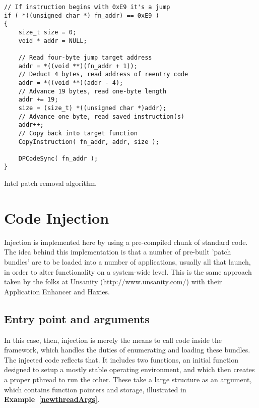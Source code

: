\documentclass[english]{article}
\begin{document}
\begin{sourcecode}
\begin{verbatim}
// If instruction begins with 0xE9 it's a jump
if ( *((unsigned char *) fn_addr) == 0xE9 )
{
    size_t size = 0;
    void * addr = NULL;

    // Read four-byte jump target address
    addr = *((void **)(fn_addr + 1));
    // Deduct 4 bytes, read address of reentry code
    addr = *((void **)(addr - 4);
    // Advance 19 bytes, read one-byte length
    addr += 19;
    size = (size_t) *((unsigned char *)addr);
    // Advance one byte, read saved instruction(s)
    addr++;
    // Copy back into target function
    CopyInstruction( fn_addr, addr, size );

    DPCodeSync( fn_addr );
}
\end{verbatim}
\caption{Intel patch removal algorithm}
\label{intelRemPatch}
\end{sourcecode}

\section{Code Injection}

Injection is implemented here by using a pre-compiled chunk of standard code. The idea behind this implementation is that a number of pre-built 'patch bundles' are to be loaded into a number of applications, usually all that launch, in order to alter functionality on a system-wide level. This is the same approach taken by the folks at Unsanity (http://www.unsanity.com/) with their Application Enhancer and Haxies.

\subsection{Entry point and arguments}
In this case, then, injection is merely the means to call code inside the framework, which handles the duties of enumerating and loading these bundles. The injected code reflects that. It includes two functions, an initial function designed to setup a mostly stable operating environment, and which then creates a proper pthread to run the other. These take a large structure as an argument, which contains function pointers and storage, illustrated in \textbf{Example~\ref{newthreadArgs}}.
\end{document}
